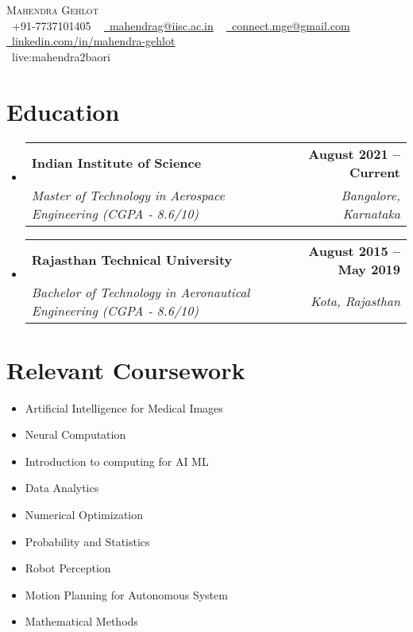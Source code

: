 \documentclass[letterpaper,11pt]{article}
\makeatletter
\newcommand{\resumeSubheading}[4]{
  \vspace{-2pt}\item
    \begin{tabular*}{1.0\textwidth}[t]{l@{\extracolsep{\fill}}r}
      \textbf{#1} & \textbf{\small #2} \\
      \textit{\small#3} & \textit{\small #4} \\
    \end{tabular*}\vspace{-7pt}
}
\newcommand{\resumeSubHeadingListStart}{\begin{itemize}[leftmargin=0.0in, label={}]}
\newcommand{\resumeSubHeadingListEnd}{\end{itemize}}
\makeatother
\begin{document}

\begin{center}
    {\Huge \scshape Mahendra Gehlot} \\ \vspace{8pt}
    \small \raisebox{-0.1\height}\faPhone\ +91-7737101405 ~ \href{mailto:mahendrag@iisc.ac.in}{\raisebox{-0.2\height}\faEnvelope\ {mahendrag@iisc.ac.in}} ~ 
    \href{mailto:connect.mge@gmail.com}{\raisebox{-0.2\height}\faEnvelope\ {connect.mge@gmail.com}} ~
    \href{https://www.linkedin.com/in/mahendra-gehlot}{\raisebox{-0.2\height}\faLinkedin\ {linkedin.com/in/mahendra-gehlot}}  ~ 
    \vspace{4pt}
    \\{\faSkype\ {live:mahendra2baori}} ~
    
    \vspace{-12pt}
\end{center}


\section{Education}
  \resumeSubHeadingListStart
    \resumeSubheading
      {Indian Institute of Science}{August 2021 -- Current}
      {Master of Technology in Aerospace Engineering (CGPA - 8.6/10)}{Bangalore, Karnataka}
  \resumeSubHeadingListEnd
  \resumeSubHeadingListStart
    \resumeSubheading
      {Rajasthan Technical University}{August 2015 -- May 2019}
      {Bachelor of Technology in Aeronautical Engineering (CGPA - 8.6/10)}{Kota, Rajasthan}
  \resumeSubHeadingListEnd

\section{Relevant Coursework}
        \begin{multicols}{4}
            \begin{itemize}[itemsep=-5pt, parsep=8pt]
                \item\small Artificial Intelligence for Medical Images
                \item Neural Computation
                \item Introduction to computing for AI ML
                \item Data Analytics
                \item Numerical Optimization
                \item Probability and Statistics
                \item Robot Perception
                \item Motion Planning for Autonomous System
                \item Mathematical Methods
            \end{itemize}
        \end{multicols}
        \vspace*{2.0\multicolsep}
\end{document}

